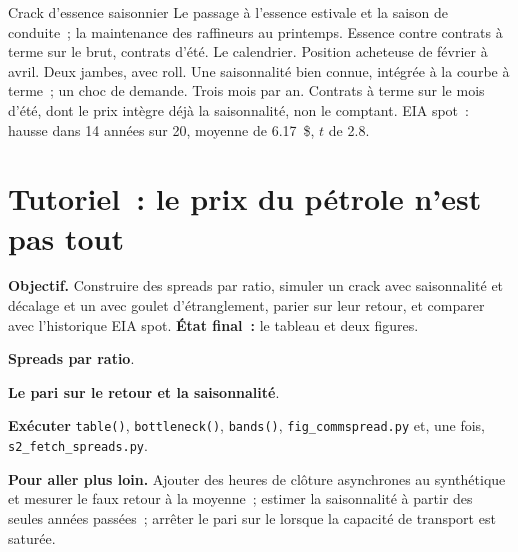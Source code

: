\begin{strategyfile}{Crack d'essence saisonnier}\label{strat:s2:commodity-spreads:season}
 Le passage à l'essence estivale et la saison de conduite~; la maintenance des raffineurs au printemps.
 Essence contre contrats à terme sur le brut, contrats d'été.
 Le calendrier.
 Position acheteuse de février à avril.
 Deux jambes, avec roll.
 Une saisonnalité bien connue, intégrée à la courbe à terme~; un choc de demande.
 Trois mois par an.
 Contrats à terme sur le mois d'été, dont le prix intègre déjà la saisonnalité, non le comptant.
 EIA spot~: hausse dans 14 années sur 20, moyenne de 6.17~\$, $t$ de 2.8.
\end{strategyfile}

\section{Tutoriel~: le prix du pétrole n'est pas tout}\label{tut:s2:commodity-spreads:tut}

\begin{tutorial}
\textbf{Objectif.} Construire des spreads par ratio, simuler un crack avec saisonnalité et décalage et un  avec goulet d'étranglement, parier sur leur retour, et comparer avec
l'historique EIA spot. \textbf{État final~:} le tableau et deux figures.
\begin{tutsteps}
\item \textbf{Spreads par ratio}.
\label{lst:s2:commodity-spreads:build}
\item \textbf{Le pari sur le retour et la saisonnalité}.
\label{lst:s2:commodity-spreads:fade}
\item \textbf{Exécuter} \texttt{table()}, \texttt{bottleneck()}, \texttt{bands()}, \texttt{fig\_commspread.py} et, une fois,
\texttt{s2\_fetch\_spreads.py}.
\end{tutsteps}
\textbf{Pour aller plus loin.} Ajouter des heures de clôture asynchrones au  synthétique et mesurer le faux retour à la moyenne~; estimer la saisonnalité
à partir des seules années passées~; arrêter le pari sur le  lorsque la capacité de transport est saturée.
\end{tutorial}

